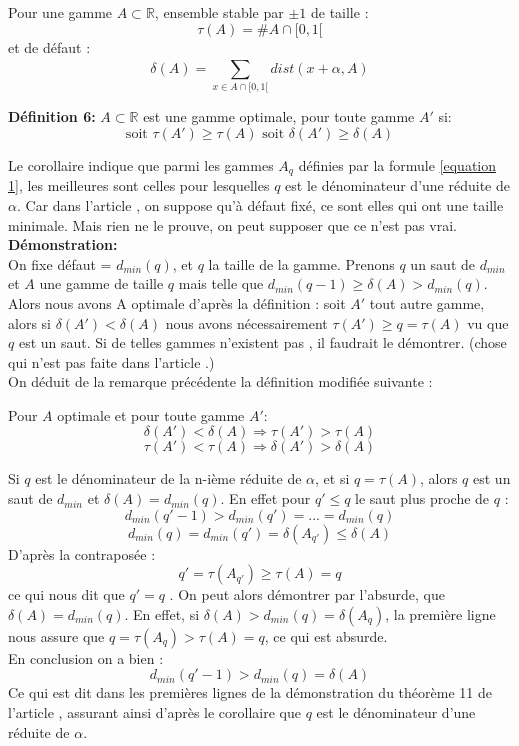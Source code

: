 \documentclass[moyen]{classeUPD}
\newenvironment{definition}{
	\begin{lrbox}{\tempbox}
		\begin{minipage}{\textwidth}
		}{
		\end{minipage}
	\end{lrbox}
	\begin{center}
		\fcolorbox[HTML]{222222}{EEEEEE}{
			\usebox{\tempbox}
		}
	\end{center}
}
\newcommand{\emf}[1]{\textbf{#1}}
\begin{document}
Pour une gamme $A \subset \mathbb{R}$, ensemble stable par $\pm1$ de taille :
$$\tau(A) =\#A \cap [0,1[ $$
et de défaut :
$$\delta(A) = \sum_{x \in A \cap [0,1[}^{}dist(x+\alpha,A)$$

\begin{definition}
\emf{Définition 6:}
 $A \subset \mathbb{R}$ est une gamme optimale, pour toute gamme $A'$ si: 
 $$\text{soit }\tau(A')\ge \tau(A) \text{ soit } \delta(A') \ge \delta(A)$$
 \end{definition}

 Le corollaire indique que parmi les gammes $A_q$ définies par la formule \eqref{equation 1}, les meilleures
 sont celles pour lesquelles $q$ est le dénominateur d'une réduite de $\alpha$. Car dans l'article \cite{caruso_application_nodate}, on suppose qu'à défaut fixé, ce sont elles qui ont une taille minimale. Mais rien ne le prouve, on peut supposer que ce n'est pas vrai.\\
 
 \emf{Démonstration:}\\
 
 On fixe défaut = $d_{min}(q)$, et $q$ la taille de la gamme.  Prenons $q$ un saut de $d_{min}$ et $A$ une gamme de taille $q$ mais telle que $d_{min}(q-1)\ge \delta (A)>d_{min}(q)$. Alors nous avons A optimale d'après la définition : soit $A'$ tout autre gamme, alors si $\delta(A')<\delta(A)$ nous avons nécessairement $\tau (A') \ge q = \tau (A)$ vu que $q$ est un saut. Si de telles gammes n'existent pas , il faudrait le démontrer. (chose qui n'est pas faite dans l'article \cite{caruso_application_nodate}.)\\
 
 On déduit de la remarque précédente la définition modifiée suivante :
 
 \begin{definition}
 Pour $A$ optimale et pour toute gamme $A'$:
 $$\delta(A') < \delta(A) \Rightarrow \tau(A') > \tau(A)$$
 $$\tau(A') < \tau(A) \Rightarrow \delta(A') > \delta(A)$$
 \end{definition}
 
 Si $q$ est le dénominateur de la n-ième réduite de $\alpha$, et si  $q =\tau(A) $, alors $q$ est un saut de $d_{min}$ et $\delta(A)= d_{min}(q)$. En effet pour $q'\leq q$ le saut plus proche de $q$ :
 $$d_{min}(q'-1) >d_{min}(q')=...=d_{min}(q) $$
 $$d_{min}(q) = d_{min}(q')=\delta(A_{q'})\leq \delta(A)$$
 D'après la contraposée :
 $$q' = \tau (A_{q'})\ge \tau (A) = q$$
ce qui nous dit que $q' = q$ . On peut alors démontrer par l’absurde, que $\delta(A)= d_{min}(q)$. En effet, si $\delta(A) > d_{min}(q) = \delta(A_{q})$,  la première ligne nous assure que $q = \tau (A_{q}) > \tau (A) = q$, ce qui est absurde. \\
En conclusion on a bien :
$$d_{min}(q'-1) >d_{min}(q)=\delta(A) $$
Ce qui est dit dans les premières lignes de la démonstration du théorème 11 de l'article \cite{caruso_application_nodate}, assurant ainsi d'après le corollaire que $q$ est le dénominateur d'une réduite de $\alpha$.
\end{document}
